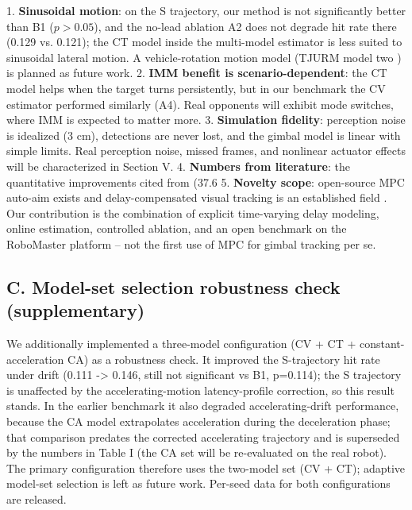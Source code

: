 \documentclass[journal]{IEEEtran}
\begin{document}
1. \textbf{Sinusoidal motion}: on the S trajectory, our method is not significantly better than B1 ($p>0.05$), and the no-lead ablation A2 does not degrade hit rate there (0.129 vs. 0.121); the CT model inside the multi-model estimator is less suited to sinusoidal lateral motion. A vehicle-rotation motion model (TJURM model two \cite{ref2}) is planned as future work.
2. \textbf{IMM benefit is scenario-dependent}: the CT model helps when the target turns persistently, but in our benchmark the CV estimator performed similarly (A4). Real opponents will exhibit mode switches, where IMM is expected to matter more.
3. \textbf{Simulation fidelity}: perception noise is idealized (3 cm), detections are never lost, and the gimbal model is linear with simple limits. Real perception noise, missed frames, and nonlinear actuator effects will be characterized in Section V.
4. \textbf{Numbers from literature}: the quantitative improvements cited from \cite{ref7} (37.6%
5. \textbf{Novelty scope}: open-source MPC auto-aim exists \cite{ref3} and delay-compensated visual tracking is an established field \cite{ref5}\cite{ref6}. Our contribution is the combination of explicit time-varying delay modeling, online estimation, controlled ablation, and an open benchmark on the RoboMaster platform -- not the first use of MPC for gimbal tracking per se.

\subsection*{C. Model-set selection robustness check (supplementary)}

We additionally implemented a three-model configuration (CV + CT + constant-acceleration CA) as a robustness check. It improved the S-trajectory hit rate under drift (0.111 -> 0.146, still not significant vs B1, p=0.114); the S trajectory is unaffected by the accelerating-motion latency-profile correction, so this result stands. In the earlier benchmark it also degraded accelerating-drift performance, because the CA model extrapolates acceleration during the deceleration phase; that comparison predates the corrected accelerating trajectory and is superseded by the numbers in Table I (the CA set will be re-evaluated on the real robot). The primary configuration therefore uses the two-model set (CV + CT); adaptive model-set selection is left as future work. Per-seed data for both configurations are released.
\end{document}
